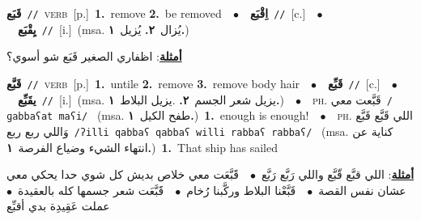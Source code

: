 \documentclass[10pt,a4paper,twoside]{article} %
\begin{document}
\begin{multicols}{2}
{\setlength\topsep{0pt}\textbf{\foreignlanguage{arabic}{قَبَع}}\ {\color{gray}\texttt{//}\color{black}}\ \textsc{verb}\ [p.]\ \textbf{1.}~remove  \textbf{2.}~be removed\ \ $\bullet$\ \ \setlength\topsep{0pt}\textbf{\foreignlanguage{arabic}{اِقْبَع}}\ {\color{gray}\texttt{//}\color{black}}\ [c.]\ \ $\bullet$\ \ \setlength\topsep{0pt}\textbf{\foreignlanguage{arabic}{يِقْبَع}}\ {\color{gray}\texttt{//}\color{black}}\ [i.]\ \color{gray}(msa. \foreignlanguage{arabic}{يُزال}~\foreignlanguage{arabic}{\textbf{٢.}}  \foreignlanguage{arabic}{يُزيل}~\foreignlanguage{arabic}{\textbf{١.}})\color{black}\  \begin{flushright}\color{gray}\foreignlanguage{arabic}{\textbf{\underline{\foreignlanguage{arabic}{أمثلة}}}: اظفاري الصغير قَبَع شو أسوي؟}\end{flushright}\color{black}} \vspace{2mm}

{\setlength\topsep{0pt}\textbf{\foreignlanguage{arabic}{قَبَّع}}\ {\color{gray}\texttt{//}\color{black}}\ \textsc{verb}\ [p.]\ \textbf{1.}~untile  \textbf{2.}~remove  \textbf{3.}~remove body hair\ \ $\bullet$\ \ \setlength\topsep{0pt}\textbf{\foreignlanguage{arabic}{قَبِّع}}\ {\color{gray}\texttt{//}\color{black}}\ [c.]\ \ $\bullet$\ \ \setlength\topsep{0pt}\textbf{\foreignlanguage{arabic}{يقَبِّع}}\ {\color{gray}\texttt{//}\color{black}}\ [i.]\ \color{gray}(msa. \foreignlanguage{arabic}{يزيل شعر الجسم}~\foreignlanguage{arabic}{\textbf{٢.}}  .\foreignlanguage{arabic}{يزيل البلاط}~\foreignlanguage{arabic}{\textbf{١.}})\color{black}\ \ $\bullet$\ \ \textsc{ph.} \color{gray} \foreignlanguage{arabic}{قَبَّعت معي}\color{black}\ {\color{gray}\texttt{/{\sffamily ɡabbaʕat maʕi}/}\color{black}}\ \color{gray} (msa. \foreignlanguage{arabic}{طفح الكيل}~\foreignlanguage{arabic}{\textbf{١.}})\color{black}\ \textbf{1.}~enough is enough!\ \ $\bullet$\ \ \textsc{ph.} \color{gray} \foreignlanguage{arabic}{اللي قَبَّع قَبَّع وَاللي ربع ربع}\color{black}\ {\color{gray}\texttt{/{\sffamily ʔilli qabbaʕ qabbaʕ willi rabbaʕ rabbaʕ}/}\color{black}}\ \color{gray} (msa. \foreignlanguage{arabic}{كناية عن انتهاء الشيء وضياع الفرصة}~\foreignlanguage{arabic}{\textbf{١.}})\color{black}\ \textbf{1.}~That ship has sailed\  \begin{flushright}\color{gray}\foreignlanguage{arabic}{\textbf{\underline{\foreignlanguage{arabic}{أمثلة}}}: اللي قبَّع قّبَّع واللي رَبَّع رَبَّع\ $\bullet$\ \  قََبَّعَت معي خلاص بديش كل شوي حدا يحكي معي عشان نفس القصة\ $\bullet$\ \  قَبَّعْنا البلاط وركَّبنا رُخام\ $\bullet$\ \  قََبَّعَت شعر جسمها كله بالعقيدة\ $\bullet$\ \  عملت عَقِيدِة بدي أقبِّع}\end{flushright}\color{black}} \vspace{2mm}


\end{multicols}
\end{document}
